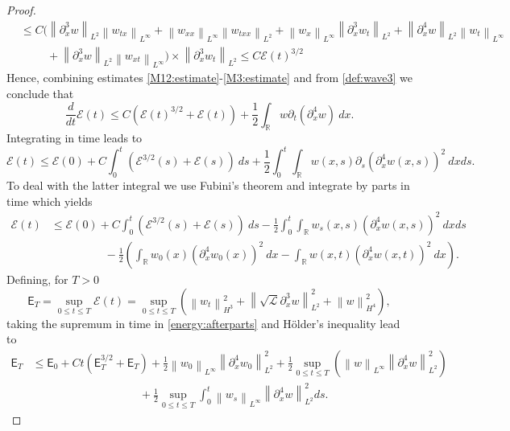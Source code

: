 \documentclass[final,11pt,a4paper,reqno]{amsart}
\newcommand{\norm}[1]{\left\| #1 \right\|}
\newcommand{\RR}{\mathbb R}
\newcommand{\pa}{\partial}
\theoremstyle{definition}
\begin{document}
\begin{proof}
\begin{align}
&\leq C\bigg(  \norm{\pa_{x}^{3}w}_{L^{2}}\norm{w_{tx}}_{L^{\infty}}+\norm{w_{xx}}_{L^{\infty}}\norm{w_{txx}}_{L^2}+\norm{w_x}_{L^{\infty}}\norm{\pa_{x}^{3}w_{t}}_{L^{2}}+\norm{\pa_{x}^{4}w}_{L^2}\norm{w_{t}}_{L^{\infty}} \nonumber\\
&\hspace{1cm} + \norm{\pa_{x}^{3}w}_{L^2}\norm{w_{xt}}_{L^{\infty}}\bigg) \times \norm{\pa_{x}^{3}w_{t}}_{L^{2}} \leq C \mathcal{E}(t)^{3/2}
\end{align}
Hence, combining estimates \eqref{M12:estimate}-\eqref{M3:estimate} and from \eqref{def:wave3} we conclude that
\begin{equation*}\label{est:energy1}
\frac{d}{dt} \mathcal{E}(t)\leq C \left( \mathcal{E}(t)^{3/2}+\mathcal{E}(t)\right)+\frac{1}{2}\int_{\RR} w \pa_{t}\left( \pa_{x}^{4}w\right) \  dx.
\end{equation*}
Integrating in time leads to
\begin{equation*}\label{adg18}
\mathcal{E}(t)\leq \mathcal{E}(0)+C\int_{0}^{t}\left(\mathcal{E}^{3/2}(s)+\mathcal{E}(s)\right) \ ds  +\frac{1}{2}\int_{0}^{t}\int_{\RR} w(x,s) \pa_{s} \left( \pa_{x}^{4} w(x,s)\right)^{2} \ dx ds.
\end{equation*}
To deal with the latter integral we use Fubini's theorem and  integrate by parts in time which yields
\begin{align}\label{energy:afterparts}
\mathcal{E}(t)&\leq \mathcal{E}(0)+C\int_{0}^{t}\left(\mathcal{E}^{3/2}(s)+\mathcal{E}(s)\right) \ ds -\frac{1}{2}\int_{0}^{t}\int_{\RR} w_{s}(x,s)  (\pa_{x}^{4} w(x,s))^{2} \ dx ds \nonumber \\
&\hspace{2cm}-\frac{1}{2}\left(\int_{\RR} w_{0}(x)(\pa_{x}^{4}w_{0}(x))^{2} \ dx-\int_{\RR}w(x,t) (\pa_{x}^{4}w(x,t))^{2} \  dx\right).
\end{align}
Defining, for $T>0$
\[ \mathsf{E}_{T}=\displaystyle\sup_{0\leq t \leq T} \mathcal{E}(t)= \displaystyle\sup_{0\leq t \leq T} \left(\norm{w_{t}}^{2}_{H^3}+\norm{\sqrt{\mathscr{L}}\pa_{x}^{3}w}^{2}_{L^2}+\norm{w}^{2}_{H^4}\right), \]
taking the supremum in time in \eqref{energy:afterparts} and H\"older's inequality lead to
\begin{align}\label{est:energy2}
	\mathsf{E}_{T}&\leq  \mathsf{E}_{0}+Ct\left(\mathsf{E}_{T}^{3/2}+	\mathsf{E}_{T}\right)  +\frac{1}{2}\norm{w_{0}}_{L^{\infty}}\norm{\pa_{x}^{4}w_{0}}_{L^{2}}^{2} +\frac{1}{2}\displaystyle\sup_{0\leq t \leq T}\left(\norm{w}_{L^{\infty}}\norm{\pa_{x}^{4}w}_{L^{2}}^{2}\right) \nonumber \\ 
	&\hspace{4cm}+  \frac{1}{2}\displaystyle\sup_{0\leq t \leq T}\int_{0}^{t} \norm{w_{s}}_{L^{\infty}}  \norm{\pa_{x}^{4} w}_{L^{2}}^{2}  ds.
\end{align}


\end{proof}
\end{document}
